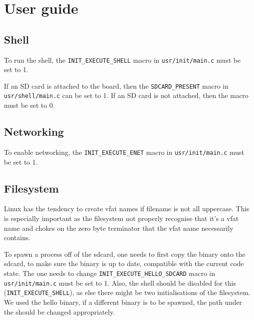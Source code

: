 \chapter{User guide}

\section{Shell}

To run the shell, the \verb|INIT_EXECUTE_SHELL| macro in \verb|usr/init/main.c| must be set to 1.

If an SD card is attached to the board, then the \verb|SDCARD_PRESENT| macro in \verb|usr/shell/main.c| can be set to 1.
If an SD card is not attached, then the macro must be set to 0.

\section{Networking}

To enable networking, the \verb|INIT_EXECUTE_ENET| macro in \verb|usr/init/main.c| must be set to 1.

\section{Filesystem}

Linux has the tendency to create vfat names if filename is not all uppercase.
This is especially important as the filesystem not properly recognise that it's
a vfat name and chokes on the zero byte terminator that the vfat name
necessarily contains.

To spawn a process off of the sdcard, one needs to first copy the binary onto
the sdcard, to make sure the binary is up to date, compatible with the current
code state.
The one needs to change \verb|INIT_EXECUTE_HELLO_SDCARD| macro in
\verb|usr/init/main.c| must be set to 1.
Also, the shell should be disabled for this (\verb|INIT_EXECUTE_SHELL|), as else
there might be two initialisations of the filesystem.
We used the hello binary, if a different binary is to be spawned, the path
under the should be changed appropriately.
